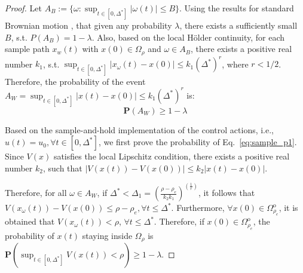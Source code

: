 \documentclass[letterpaper, 10pt, conference]{ieeeconf}
\begin{document}
\begin{proof}
Let $A_B:= \{\omega : \sup_{t \in [0, \Delta^*]} \vert \omega(t)\vert \leq B\}$. Using the results for standard Brownian motion \cite{ciesielski1962first}, that given any probability $\lambda$, there exists a sufficiently small $B$, s.t. $P(A_B)=1-\lambda$. Also, based on the local H\"{o}lder continuity, for each sample path $x_w(t)$ with $x(0) \in \Omega_{\rho}$ and $\omega \in A_B$, there exists a positive real number $k_1$, s.t. $\sup_{t \in [0, \Delta^*]} \vert x_\omega(t)-x(0)\vert \leq k_1(\Delta^*)^r$, where $r < 1/2$. Therefore, the probability of the event $A_W = \sup_{t \in [0, \Delta^*]} \vert x(t)-x(0)\vert \leq k_1(\Delta^*)^r$ is:
\begin{equation}
\label{eq:sample_proof_p1}
\mathbf{P}(A_W) \geq 1-\lambda
\end{equation}




Based on the sample-and-hold implementation of the control actions, i.e., $u(t)=u_0, \forall t \in [0, \Delta^*]$, 
we first prove the probability of Eq.~\ref{eq:sample_p1}. Since $V(x)$ satisfies the local Lipschitz condition, there exists a positive real number $k_2$, such that $\vert V(x(t))-V(x(0)) \vert \leq k_2 \vert x(t)- x(0) \vert$.

Therefore, for all $\omega \in A_W$, if $\Delta^* < \Delta_1 = (\frac{\rho-\rho_e}{k_2k_1})^{(\frac{1}{r})}$, it follows that $V(x_\omega(t))-V(x(0)) \leq \rho -\rho_e, \forall t \leq \Delta^*$. Furthermore, $\forall x(0) \in \Omega_{\rho_{e}}^{\text{o}}$, it is obtained that $V(x_\omega(t)) < \rho$, $\forall t \leq \Delta^*$. Therefore, if $x(0) \in  \Omega_{\rho_{e}}^{\text{o}}$, the probability of $x(t)$ staying inside $\Omega_{\rho}$ is $\mathbf{P}(\sup_{t \in [0,\Delta^*]} V(x(t)) < \rho) \geq 1-\lambda$. 



\end{proof}
\end{document}
